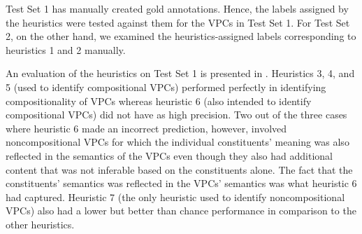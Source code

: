 \documentclass[output=paper
,modfonts
,nonflat]{langsci/langscibook}
\begin{document}
Test Set 1 has manually created gold annotations. Hence, the labels assigned by the heuristics were tested against them 
for the VPCs in Test Set 1. For Test Set 2, on the other hand, we examined the heuristics-assigned labels corresponding to heuristics 1 and 2 manually. 
 

An evaluation of the heuristics on Test Set 1 is presented in . Heuristics 3, 4, and 5 (used to identify compositional VPCs) performed perfectly in identifying compositionality of VPCs whereas heuristic 6 (also intended to identify compositional VPCs) did not have as high precision. Two out of the three cases where heuristic 6 made an incorrect prediction, however, involved noncompositional VPCs for which the individual constituents' meaning was also reflected in the semantics of the VPCs even though they also had additional content that was not inferable based on the constituents alone. The fact that the constituents' semantics was reflected in the VPCs' semantics was what heuristic 6 had captured. Heuristic 7 (the only heuristic used to identify noncompositional VPCs) also had a lower but better than chance performance in comparison to the other heuristics. 


\begin{table}
\caption[Evaluation of heuristics 3--7 using Test Set 1 (50 test cases)]{Evaluation of heuristics 3--7 using Test Set 1 (50 test cases)\footnote{We define precision as Cn/Tn and coverage as Tn/N, where N is the corpus size, Tn is the sample size that heuristic n is applicable to, and Cn is the number of correct assignments it makes.}}
\label{tab:1:eval-heur}
\end{table}
\end{document}
